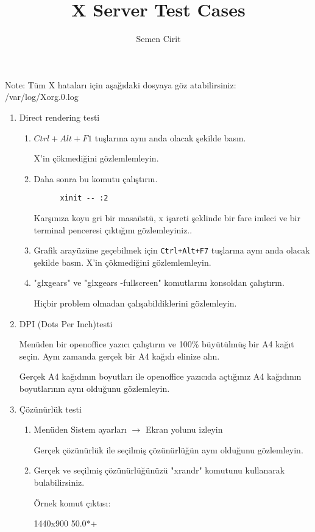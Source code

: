 \documentclass[a4paper,10pt]{article}
\title{X Server Test Cases}
\author{Semen Cirit}
\begin{document}
\maketitle

 Note:	
  	Tüm X hataları için  aşağıdaki dosyaya göz atabilirsiniz:
	/var/log/Xorg.0.log  
\begin{enumerate}
  \item Direct rendering testi
    \begin{enumerate}
    \item   $Ctrl+Alt+F1$ tuşlarına aynı anda olacak şekilde basın.

	    X'in çökmediğini gözlemlemleyin.
    \item  Daha sonra bu komutu çalıştırın.
	  \begin{verbatim}
	  xinit -- :2
	  \end{verbatim}
	  Karşınıza koyu gri bir masaüstü, x işareti şeklinde bir fare imleci ve bir terminal penceresi çıktığını gözlemleyiniz..
    \item Grafik arayüzüne geçebilmek için \texttt{Ctrl+Alt+F7} tuşlarına aynı anda olacak şekilde basın.    
	   X'in çökmediğini gözlemlemleyin.
    \item "glxgears" ve "glxgears -fullscreen" komutlarını konsoldan çalıştırın.

	  Hiçbir problem olmadan çalışabildiklerini gözlemleyin.
    \end{enumerate}

  \item DPI (Dots Per Inch)testi
    
        Menüden bir openoffice yazıcı çalıştırın ve 100\% büyütülmüş bir A4 kağıt seçin. Aynı zamanda gerçek bir A4 kağıdı elinize alın.

        Gerçek A4 kağıdının boyutları ile openoffice yazıcıda açtığınız A4 kağıdının boyutlarının aynı olduğunu gözlemleyin.
  \item Çözünürlük testi
     \begin{enumerate}
      \item Menüden Sistem ayarları $\rightarrow$ Ekran yolunu izleyin

	Gerçek çözünürlük ile seçilmiş çözünürlüğün aynı olduğunu gözlemleyin.

      \item Gerçek ve seçilmiş çözünürlüğünüzü "xrandr" komutunu kullanarak bulabilirsiniz.
	  
	  Örnek komut çıktısı:
	  
	  1440x900  50.0*+
	  

\end{enumerate}
\end{enumerate}
\end{document}
